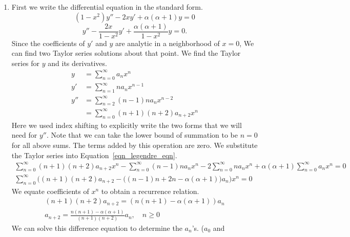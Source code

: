 {%
\begin{Solution}
  \label{solution legendre eqn}
  \begin{enumerate}
  \item
    First we write the differential equation in the standard form.
    \begin{equation}
      \label{eqn_legendre_eqn}
      \left( 1 - x^2 \right) y'' - 2 x y' + \alpha (\alpha + 1) y = 0
    \end{equation}
    \begin{equation}
      \label{eqn_legendre_eqn_norm}
      y'' - \frac{2 x}{1 - x^2} y' + \frac{ \alpha (\alpha + 1) }{1 - x^2} y = 0.
    \end{equation}
    Since the coefficients of $y'$ and $y$ are analytic in a neighborhood of
    $x = 0$, We can find two Taylor series solutions about that point.
    We find the Taylor series for $y$ and its derivatives.
    \begin{align*}
      y &= \sum_{n=0}^\infty a_n x^n 
      \\
      y' &= \sum_{n=1}^\infty n a_n x^{n-1} 
      \\
      y'' &= \sum_{n=2}^\infty (n-1) n a_n x^{n-2} 
      \\
      &= \sum_{n=0}^\infty (n+1) (n+2) a_{n+2} x^{n}
    \end{align*}
    Here we used index shifting to explicitly write the two forms that
    we will need for $y''$.  Note that we can take the lower bound of
    summation to be $n = 0$ for all above sums.  The terms added by
    this operation are zero.  We substitute the Taylor series into
    Equation~\ref{eqn_legendre_eqn}.
    \begin{gather*}
      \sum_{n=0}^\infty (n+1) (n+2) a_{n+2} x^{n}
      - \sum_{n=0}^\infty (n-1) n a_n x^n
      - 2 \sum_{n=0}^\infty n a_n x^n
      + \alpha (\alpha+1) \sum_{n=0}^\infty a_n x^n  = 0 
      \\
      \sum_{n=0}^\infty \Big( (n+1)(n+2) a_{n+2} - \big( (n-1) n + 2 n - \alpha (\alpha+1)
      \big) a_n \Big) x^n = 0
    \end{gather*}
    We equate coefficients of $x^n$ to obtain a recurrence relation.
    \begin{gather*}
      (n+1)(n+2) a_{n+2} = ( n (n+1) - \alpha (\alpha+1) ) a_n 
      \\
      a_{n+2} = \frac{ n (n+1) - \alpha (\alpha+1) }{ (n+1)(n+2) } a_n,  \quad n \geq 0
    \end{gather*}
    We can solve this difference equation to determine the $a_n$'s.  ($a_0$ and

\end{enumerate}
\end{Solution}}
